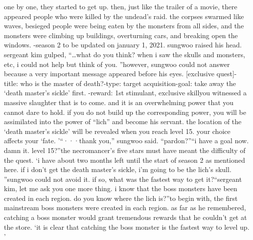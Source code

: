  one by one, they started to get up.
 then, just like the trailer of a movie, there appeared people who were killed by the undead’s raid.
 the corpses swarmed like waves, besieged people were being eaten by the monsters from all sides, and the monsters were climbing up buildings, overturning cars, and breaking open the windows.
-season 2  to be updated on january 1, 2021.
sungwoo raised his head.
 sergeant kim gulped, “…what do you think? when i saw the skulls and monsters, etc, i could not help but think of you.
”however, sungwoo could not answer because a very important message appeared before his eyes.
[exclusive quest]-title: who is the master of death?-type: target acquisition-goal: take away the ‘death master’s sickle’ first.
-reward: 1st stimulant, exclusive skillyou witnessed a massive slaughter that is to come.
 and it is an overwhelming power that you cannot dare to hold.
 if you do not build up the corresponding power, you will be assimilated into the power of “lich” and become his servant.
the location of the ‘death master’s sickle’ will be revealed when you reach level 15.
your choice affects your ‘fate.
’“···thank you,” sungwoo said.
“pardon?”“i have a goal now.
 damn it.
 level 15?”the necromancer’s five stars must have meant the difficulty of the quest.
‘i have about two months left until the start of season 2 as mentioned here.
 if i don’t get the death master’s sickle, i’m going to be the lich’s skull.
”sungwoo could not avoid it.
 if so, what was the fastest way to get it?“sergeant kim, let me ask you one more thing.
 i know that the boss monsters have been created in each region.
 do you know where the lich is?”to begin with, the first mainstream boss monsters were created in each region.
 as far as he remembered, catching a boss monster would grant tremendous rewards that he couldn’t get at the store.
‘it is clear that catching the boss monster is the fastest way to level up.
’

